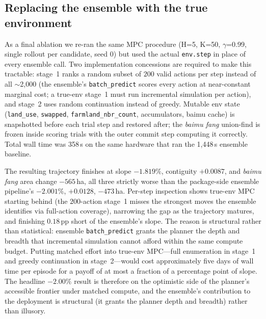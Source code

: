 \documentclass[11pt]{article}
\begin{document}
\subsection*{Replacing the ensemble with the true environment}\label{sec:methods-trueenv}

As a final ablation we re-ran the same MPC procedure (H=5, K=50, $\gamma$=0.99, single rollout per candidate, seed 0) but used the actual \texttt{env.step} in place of every ensemble call. Two implementation concessions are required to make this tractable: stage~1 ranks a random subset of $200$ valid actions per step instead of all $\sim$2{,}000 (the ensemble's \texttt{batch\_predict} scores every action at near-constant marginal cost; a true-env stage~1 must run incremental simulation per action), and stage~2 uses random continuation instead of greedy. Mutable env state (\texttt{land\_use}, \texttt{swapped}, \texttt{farmland\_nbr\_count}, accumulators, baimu cache) is snapshotted before each trial step and restored after; the \textit{baimu fang} union-find is frozen inside scoring trials with the outer commit step computing it correctly. Total wall time was 358\,s on the same hardware that ran the 1{,}448\,s ensemble baseline.

The resulting trajectory finishes at slope $-1.819\%$, contiguity $+0.0087$, and \textit{baimu fang} area change $-565$\,ha, all three strictly worse than the package-side ensemble pipeline's $-2.001\%$, $+0.0128$, $-473$\,ha. Per-step inspection shows true-env MPC starting behind (the $200$-action stage~1 misses the strongest moves the ensemble identifies via full-action coverage), narrowing the gap as the trajectory matures, and finishing $0.18$\,pp short of the ensemble's slope. The reason is structural rather than statistical: ensemble \texttt{batch\_predict} grants the planner the depth and breadth that incremental simulation cannot afford within the same compute budget. Putting matched effort into true-env MPC---full enumeration in stage~1 and greedy continuation in stage~2---would cost approximately five days of wall time per episode for a payoff of at most a fraction of a percentage point of slope. The headline $-2.00\%$ result is therefore on the optimistic side of the planner's accessible frontier under matched compute, and the ensemble's contribution to the deployment is structural (it grants the planner depth and breadth) rather than illusory.
\end{document}
